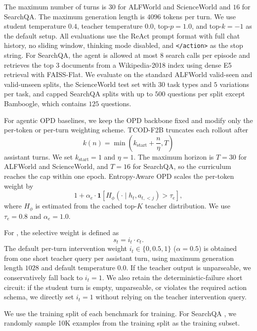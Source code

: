 The maximum number of turns is $30$ for ALFWorld and ScienceWorld and $16$ for SearchQA.
%
The maximum generation length is $4096$ tokens per turn.
%
We use student temperature $0.4$, teacher temperature $0.0$, top-$p=1.0$, and top-$k=-1$ as the default setup.
%
All evaluations use the ReAct prompt format with full chat history, no sliding window, thinking mode disabled, and \texttt{</action>} as the stop string.
%
For SearchQA, the agent is allowed at most $8$ search calls per episode and retrieves the top $3$ documents from a Wikipedia-2018 index using dense E5 retrieval with FAISS-Flat.
%
We evaluate on the standard ALFWorld valid-seen and valid-unseen splits, the ScienceWorld test set with $30$ task types and $5$ variations per task, and capped SearchQA splits with up to $500$ questions per split except Bamboogle, which contains $125$ questions.


For agentic OPD baselines, we keep the OPD backbone fixed and modify only the per-token or per-turn weighting scheme. TCOD-F2B truncates each rollout after
\begin{equation}
    k(n) = \min\left(k_{\mathrm{start}} + \frac{n}{\eta}, T\right)
\end{equation}
assistant turns. We set $k_{\mathrm{start}}=1$ and $\eta=1$. The maximum horizon is $T=30$ for ALFWorld and ScienceWorld, and $T=16$ for SearchQA, so the curriculum reaches the cap within one epoch. Entropy-Aware OPD scales the per-token weight by
\begin{equation}
    1 + \alpha_e \cdot \mathbf{1}
    \left[
    H_{\phi}(\cdot \mid h_t,a_{t,<j}) > \tau_e
    \right],
\end{equation}
where $H_{\phi}$ is estimated from the cached top-$K$ teacher distribution. We use $\tau_e=0.8$ and $\alpha_e=1.0$.

For \ours{}, the selective weight is defined as
\begin{equation}
    s_t = i_t \cdot c_t.
\end{equation}
The default per-turn intervention weight $i_t \in \{0,0.5,1\}$ ($\alpha=0.5$) is obtained from one short teacher query per assistant turn, using maximum generation length $1028$ and default temperature $0.0$. If the teacher output is unparseable, we conservatively fall back to $i_t=1$. We also retain the deterministic-failure short circuit: if the student turn is empty, unparseable, or violates the required action schema, we directly set $i_t=1$ without relying on the teacher intervention query.

We use the training split of each benchmark for training. For SearchQA \citep{jin2025search}, we randomly sample 10K examples from the training split as the training subset.

